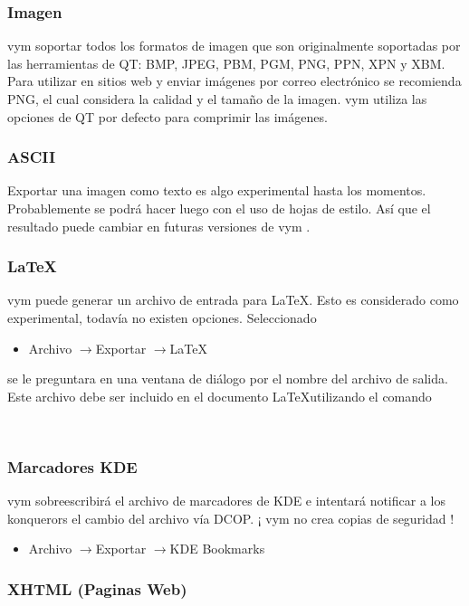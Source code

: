 \documentclass{article}
\newcommand{\vym}{{\sc vym }}
\newcommand{\ra}{$\longrightarrow$}
\begin{document}
\subsubsection*{Imagen}
\vym soportar todos los formatos de imagen que son originalmente soportadas por las herramientas de QT: BMP, JPEG, PBM, PGM, PNG, PPN, XPN y XBM. Para utilizar en sitios web y enviar im\'agenes por correo electr\'onico se recomienda PNG, el cual considera la calidad y el tama\~no de la imagen. \vym utiliza las opciones de QT por defecto para comprimir las im\'agenes.

\subsubsection*{ASCII}
	Exportar una imagen como texto es algo experimental hasta los momentos. Probablemente se podr\'a hacer luego con el uso de hojas de estilo. As\'i que el resultado puede cambiar en futuras versiones de \vym.

\subsubsection*{\LaTeX}
\vym puede generar un archivo de entrada para \LaTeX. Esto es considerado como experimental, todav\'ia no existen opciones. Seleccionado
\begin{itemize}
	\item 	Archivo \ra Exportar \ra \LaTeX
\end{itemize}
	se le preguntara en una ventana de di\'alogo por el nombre del archivo de salida. Este archivo debe ser incluido en el documento \LaTeX utilizando el comando
\begin{verbatim}
	
\end{verbatim}

\subsubsection*{Marcadores KDE}
\vym sobreescribir\'a el archivo de marcadores de KDE e intentar\'a notificar a los konquerors el cambio del archivo v\'ia DCOP. 
¡ \vym no crea copias de seguridad !
\begin{itemize}
	\item Archivo \ra Exportar \ra KDE Bookmarks
\end{itemize}

\subsubsection*{XHTML (Paginas Web)}
\end{document}
